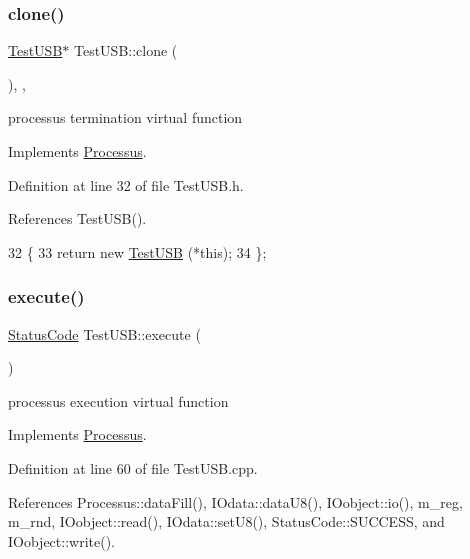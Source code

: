 \subsubsection{\texorpdfstring{clone()}{clone()}}
{\footnotesize\ttfamily \hyperlink{classTestUSB_1_1TestUSB}{Test\+U\+SB}$\ast$ Test\+U\+S\+B\+::clone (\begin{DoxyParamCaption}{ }\end{DoxyParamCaption})\hspace{0.3cm}{\ttfamily [inline]}, {\ttfamily [protected]}, {\ttfamily [virtual]}}

processus termination virtual function 

Implements \hyperlink{classProcessus_aca8856f6d6d7b7e1fe941f298dcbb502}{Processus}.



Definition at line 32 of file Test\+U\+S\+B.\+h.



References Test\+U\+S\+B().


\begin{DoxyCode}
32                   \{
33     \textcolor{keywordflow}{return} \textcolor{keyword}{new} \hyperlink{classTestUSB_a4aae5a332f7484f9ef05296b638975c1}{TestUSB} (*\textcolor{keyword}{this});
34   \};
\end{DoxyCode}
\mbox{\label{classTestUSB_a8c3d68e00ec4f10ec638969756a925a8}} 
\subsubsection{\texorpdfstring{execute()}{execute()}}
{\footnotesize\ttfamily \hyperlink{classStatusCode}{Status\+Code} Test\+U\+S\+B\+::execute (\begin{DoxyParamCaption}{ }\end{DoxyParamCaption})\hspace{0.3cm}{\ttfamily [virtual]}}

processus execution virtual function 

Implements \hyperlink{classProcessus_a63767a63a1fb0055c5aa45b21a4a5d58}{Processus}.



Definition at line 60 of file Test\+U\+S\+B.\+cpp.



References Processus\+::data\+Fill(), I\+Odata\+::data\+U8(), I\+Oobject\+::io(), m\+\_\+reg, m\+\_\+rnd, I\+Oobject\+::read(), I\+Odata\+::set\+U8(), Status\+Code\+::\+S\+U\+C\+C\+E\+SS, and I\+Oobject\+::write().



